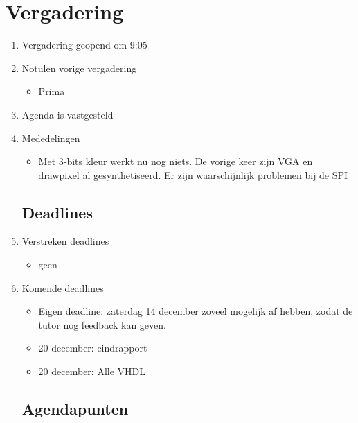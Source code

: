 \documentclass{article}
\begin{document}
\section*{Vergadering}
\begin{enumerate}
	
	\subsection*{Vooraf}
	\item Vergadering geopend om 9:05%
	\item Notulen vorige vergadering
	\begin{itemize}
		\item Prima
	\end{itemize}
	\item Agenda is vastgesteld
	\item Mededelingen
	\begin{itemize}
		\item Met 3-bits kleur werkt nu nog niets. De vorige keer zijn VGA en drawpixel al gesynthetiseerd. Er zijn waarschijnlijk problemen bij de SPI
	\end{itemize}

	\subsection*{Deadlines}
	\item Verstreken deadlines
	\begin{itemize}
		\item geen
	\end{itemize}
	\item Komende deadlines
	\begin{itemize}
		\item Eigen deadline: zaterdag 14 december zoveel mogelijk af hebben, zodat de tutor nog feedback kan geven. 
		\item 20 december: eindrapport
		\item 20 december: Alle VHDL
	\end{itemize}

	\subsection*{Agendapunten}
	


\end{enumerate}
\end{document}
